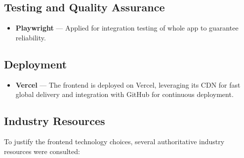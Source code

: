 \subsection{Testing and Quality Assurance}
\begin{itemize}
    \item \textbf{Playwright } --- Applied for integration testing of whole app to guarantee reliability.
\end{itemize}

\subsection{Deployment}
\begin{itemize}
    \item \textbf{Vercel} --- The frontend is deployed on Vercel, leveraging its CDN for fast global delivery and integration with GitHub for continuous deployment.
\end{itemize}


\subsection{Industry Resources}
To justify the frontend technology choices, several authoritative industry resources were consulted:

